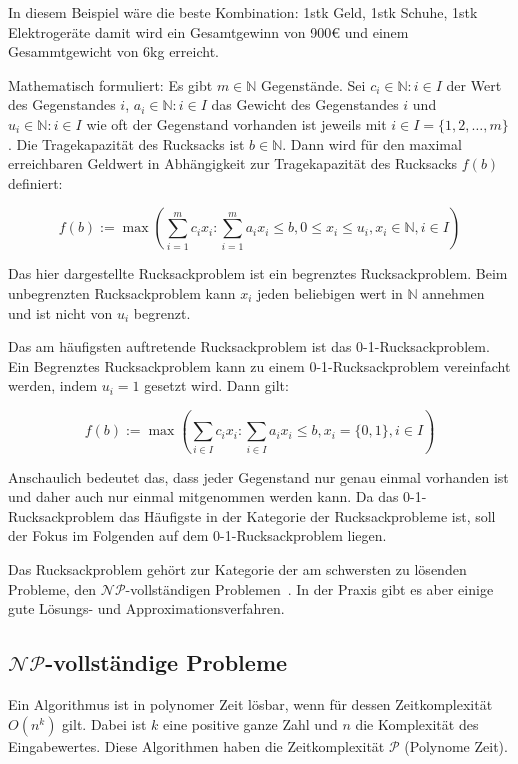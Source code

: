 \documentclass[12pt, a4paper, ngerman]{article}
\newcommand{\natnums}{\ensuremath{\mathbb{N}}}
\begin{document}
In diesem Beispiel wäre die beste Kombination: 1stk Geld, 1stk Schuhe, 1stk Elektrogeräte
damit wird ein Gesamtgewinn von 900€ und einem Gesammtgewicht von 6kg erreicht.

Mathematisch formuliert: Es gibt \(m\in\natnums\) Gegenstände.
Sei \(c_i\in\natnums : i\in I\) der Wert des Gegenstandes \(i\),
\(a_i\in\natnums : i\in I\) das Gewicht des Gegenstandes \(i\)
und \(u_i\in \natnums : i\in I\) wie oft der Gegenstand vorhanden ist jeweils mit \(i\in I = \{1 ,2 ,\ldots ,m\} \).
Die Tragekapazität des Rucksacks ist \(b\in\natnums\).
Dann wird für den maximal erreichbaren Geldwert in Abhängigkeit zur Tragekapazität des Rucksacks \(f(b)\) definiert:

\[
  f(b):=\max(\sum_{i=1}^m c_i x_i : \sum_{i=1}^m a_i x_i\leq b, 0\leq x_i\leq u_i,  x_i\in\natnums, i\in I)
\]

Das hier dargestellte Rucksackproblem ist ein begrenztes Rucksackproblem.
Beim unbegrenzten Rucksackproblem kann \(x_i\) jeden beliebigen wert in \(\natnums \) annehmen und ist nicht von \(u_i\) begrenzt.

Das am häufigsten auftretende Rucksackproblem ist das 0-1-Rucksackproblem.
Ein Begrenztes Rucksackproblem kann zu einem 0-1-Rucksackproblem vereinfacht werden, indem \(u_i=1\) gesetzt wird. Dann gilt:

\[
  f(b):=\max(\sum_{i\in I}c_i x_i : \sum_{i\in I}a_i x_i\leq b,x_i=\{0,1\}, i\in I)
\]

Anschaulich bedeutet das, dass jeder Gegenstand nur genau einmal vorhanden ist
und daher auch nur einmal mitgenommen werden kann.
Da das 0-1-Rucksackproblem das Häufigste in der Kategorie der Rucksackprobleme ist,
soll der Fokus im Folgenden auf dem 0-1-Rucksackproblem liegen.

Das Rucksackproblem gehört zur Kategorie der am schwersten zu lösenden Probleme,
den \(\mathcal{NP}\)-vollständigen Problemen~\cite{mainKnapsack}.
In der Praxis gibt es aber einige gute Lösungs- und Approximationsverfahren.

\subsection{\(\mathcal{NP}\)-vollständige Probleme}
\label{sec:np}

Ein Algorithmus ist in polynomer Zeit lösbar,
wenn für dessen Zeitkomplexität \(O(n^k)\) gilt.
Dabei ist \(k\) eine positive ganze Zahl und \(n\) die Komplexität des Eingabewertes.
Diese Algorithmen haben die Zeitkomplexität \(\mathcal{P}\) (Polynome Zeit).
\end{document}

